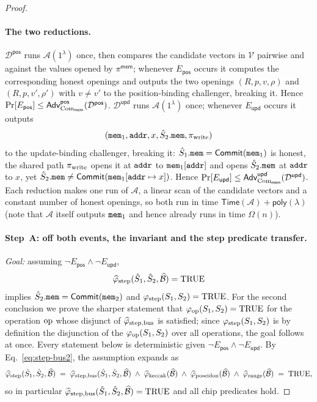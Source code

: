 \begin{proof}
\paragraph{The two reductions.}
$\mathcal{D}^{\mathsf{pos}}$ runs $\mathcal{A}(1^\lambda)$ once, then compares the
candidate vectors in $\mathcal{V}$ pairwise and against the values opened by
$\pi^{\mathsf{mem}}$; whenever
$E_{\mathsf{pos}}$ occurs it computes the corresponding honest openings and
outputs the two openings
$(R,p,v,\rho)$ and $(R,p,v',\rho')$ with $v\neq v'$ to the position-binding
challenger, breaking it. Hence
$\Pr[E_{\mathsf{pos}}]\le\mathsf{Adv}^{\mathsf{pos}}_{\mathrm{Com}_{\mathsf{mem}}}(\mathcal{D}^{\mathsf{pos}})$.
$\mathcal{D}^{\mathsf{upd}}$ runs $\mathcal{A}(1^\lambda)$ once; whenever
$E_{\mathsf{upd}}$ occurs it outputs
\[
  (\mathtt{mem}_1,\mathtt{addr},x,\hat{S}_2.\mathtt{mem},\pi_{\mathrm{write}})
\]
to the update-binding challenger, breaking it: $\hat{S}_1.\mathtt{mem}=\mathsf{Commit}(\mathtt{mem}_1)$
is honest, the shared path $\pi_{\mathrm{write}}$ opens it at $\mathtt{addr}$ to $\mathtt{mem}_1[\mathtt{addr}]$
and opens $\hat{S}_2.\mathtt{mem}$ at $\mathtt{addr}$ to $x$, yet
$\hat{S}_2.\mathtt{mem}\neq\mathsf{Commit}(\mathtt{mem}_1[\mathtt{addr}\mapsto x])$. Hence
$\Pr[E_{\mathsf{upd}}]\le\mathsf{Adv}^{\mathsf{upd}}_{\mathrm{Com}_{\mathsf{mem}}}(\mathcal{D}^{\mathsf{upd}})$.
Each reduction makes one run of $\mathcal{A}$, a linear scan of the candidate
vectors and a constant number of honest openings, so both run in time
$\mathsf{Time}(\mathcal{A})+\mathsf{poly}(\lambda)$ (note that $\mathcal{A}$
itself outputs $\mathtt{mem}_1$ and hence already runs in time $\Omega(n)$).

\paragraph{Step~A: off both events, the invariant and the step predicate transfer.}
\textit{Goal:} assuming $\neg E_{\mathsf{pos}}\wedge\neg E_{\mathsf{upd}}$,
\[
  \widehat{\varphi}_{\mathrm{step}}(\hat{S}_1,\hat{S}_2,\widehat{\mathcal{B}})=\mathrm{TRUE}
\]
implies $\hat{S}_2.\mathtt{mem}=\mathsf{Commit}(\mathtt{mem}_2)$ and
$\varphi_{\mathrm{step}}(S_1,S_2)=\mathrm{TRUE}$.  For the second conclusion we prove the
sharper statement that $\varphi_{\mathrm{op}}(S_1,S_2)=\mathrm{TRUE}$ for the operation
$\mathrm{op}$ whose disjunct of $\widehat{\varphi}_{\mathrm{step},\mathrm{bus}}$ is satisfied; since
$\varphi_{\mathrm{step}}(S_1,S_2)$ is by definition the disjunction of the
$\varphi_{\mathrm{op}}(S_1,S_2)$ over all operations, the goal follows at once.
Every statement below is deterministic given
$\neg E_{\mathsf{pos}}\wedge\neg E_{\mathsf{upd}}$.
By Eq.~\eqref{eq:step-bus2}, the assumption expands as
\[
  \widehat{\varphi}_{\mathrm{step}}(\hat{S}_1,\hat{S}_2,\widehat{\mathcal{B}})
  \;=\;
  \widehat{\varphi}_{\mathrm{step},\mathrm{bus}}(\hat{S}_1,\hat{S}_2,\widehat{\mathcal{B}})
  \;\wedge\;
  \widehat{\varphi}_{\mathrm{keccak}}(\widehat{\mathcal{B}})
  \;\wedge\;
  \widehat{\varphi}_{\mathrm{poseidon}}(\widehat{\mathcal{B}})
  \;\wedge\;
  \widehat{\varphi}_{\mathrm{range}}(\widehat{\mathcal{B}})
  \;=\;\mathrm{TRUE},
\]
so in particular
$\widehat{\varphi}_{\mathrm{step},\mathrm{bus}}(\hat{S}_1,\hat{S}_2,\widehat{\mathcal{B}})=\mathrm{TRUE}$
and all chip predicates hold.


\end{proof}
